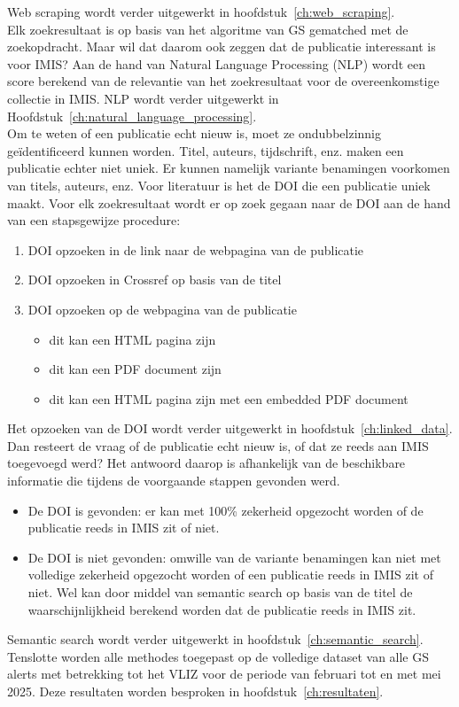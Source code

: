 Web scraping wordt verder uitgewerkt in hoofdstuk~\ref{ch:web_scraping}.\\
Elk zoekresultaat is op basis van het algoritme van GS gematched met de zoekopdracht. Maar wil dat daarom ook zeggen dat de publicatie interessant is voor IMIS? Aan de hand van Natural Language Processing (NLP) wordt een score berekend van de relevantie van het zoekresultaat voor de overeenkomstige collectie in IMIS. NLP wordt verder uitgewerkt in Hoofdstuk~\ref{ch:natural_language_processing}.\\
Om te weten of een publicatie echt nieuw is, moet ze ondubbelzinnig geïdentificeerd kunnen worden. Titel, auteurs, tijdschrift, enz. maken een publicatie echter niet uniek. Er kunnen namelijk variante benamingen voorkomen van titels, auteurs, enz. Voor literatuur is het de DOI die een publicatie uniek maakt. Voor elk zoekresultaat wordt er op zoek gegaan naar de DOI aan de hand van een stapsgewijze procedure:
\begin{enumerate}
    \item DOI opzoeken in de link naar de webpagina van de publicatie
    \item DOI opzoeken in Crossref op basis van de titel
    \item DOI opzoeken op de webpagina van de publicatie
    \begin{itemize}
        \item dit kan een HTML pagina zijn
        \item dit kan een PDF document zijn
        \item dit kan een HTML pagina zijn met een embedded PDF document
    \end{itemize}
\end{enumerate}
Het opzoeken van de DOI wordt verder uitgewerkt in hoofdstuk~\ref{ch:linked_data}.\\
Dan resteert de vraag of de publicatie echt nieuw is, of dat ze reeds aan IMIS toegevoegd werd? Het antwoord daarop is afhankelijk van de beschikbare informatie die tijdens de voorgaande stappen gevonden werd.
\begin{itemize}
    \item De DOI is gevonden: er kan met 100\% zekerheid opgezocht worden of de publicatie reeds in IMIS zit of niet.
    \item De DOI is niet gevonden: omwille van de variante benamingen kan niet met volledige zekerheid opgezocht worden of een publicatie reeds in IMIS zit of niet. Wel kan door middel van semantic search op basis van de titel de waarschijnlijkheid berekend worden dat de publicatie reeds in IMIS zit.
\end{itemize}
Semantic search wordt verder uitgewerkt in hoofdstuk~\ref{ch:semantic_search}.\\
Tenslotte worden alle methodes toegepast op de volledige dataset van alle GS alerts met betrekking tot het VLIZ voor de periode van februari tot en met mei 2025. Deze resultaten worden besproken in hoofdstuk~\ref{ch:resultaten}.




